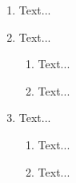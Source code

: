 \documentclass{article}
\begin{document}
\begin{enumerate}[label=\arabic*)]
	\item Text...

	\item Text...
	\begin{enumerate}[label=\textbullet]
		\item Text...
		\item Text...
	\end{enumerate}

	\item Text...
	\begin{enumerate}[label=+]
		\item Text...
		\item Text...
	\end{enumerate}
\end{enumerate}
\end{document}
